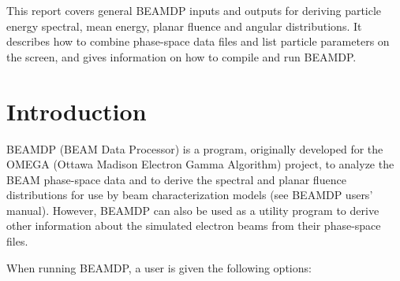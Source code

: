 \documentclass[12pt,twoside]{article}
\begin{document}
This report covers general BEAMDP inputs and outputs for deriving particle
energy spectral, mean energy, planar fluence and angular distributions.
It   describes how to combine phase-space data files and list particle
parameters on the screen,  and gives information on how to compile and run
BEAMDP.

\newpage
\mbox{}
\newpage

\setcounter{page}{1}
\pagestyle{fancy}
\tableofcontents

\newpage

\section{Introduction}

\noindent
BEAMDP (BEAM Data Processor) is a program,
originally developed for the OMEGA (Ottawa
Madison Electron Gamma Algorithm) project, to analyze the BEAM phase-space
data and to derive the spectral and planar fluence distributions for use
by beam characterization models (see BEAMDP users' manual). However,
BEAMDP can also be used as a utility program to derive other information
about the simulated electron beams from their phase-space files.

\noindent
When running BEAMDP, a user is given the following options:
\end{document}
